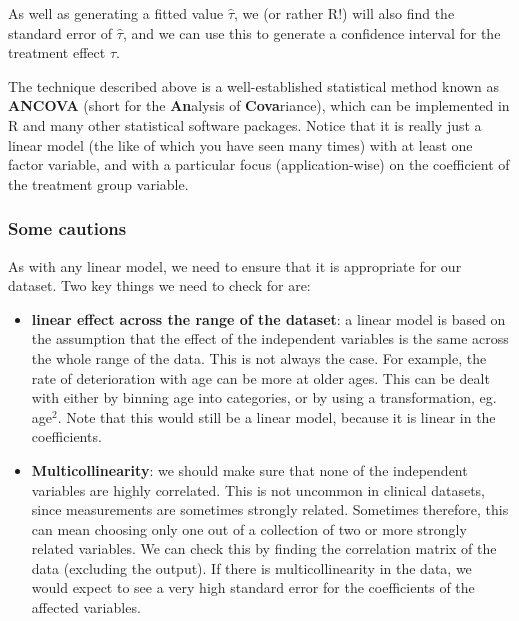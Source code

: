 \documentclass[
  openany]{book}
\providecommand{\tightlist}{%
  \setlength{\itemsep}{0pt}\setlength{\parskip}{0pt}}
\theoremstyle{definition}
\theoremstyle{definition}
\theoremstyle{definition}
\theoremstyle{definition}
\theoremstyle{remark}
\begin{document}
As well as generating a fitted value \(\hat{\tau}\), we (or rather R!) will also find the standard error of \(\hat\tau\), and we can use this to generate a confidence interval for the treatment effect \(\tau\).

The technique described above is a well-established statistical method known as \textbf{ANCOVA} (short for the \textbf{An}alysis of \textbf{Cova}riance), which can be implemented in R and many other statistical software packages. Notice that it is really just a linear model (the like of which you have seen many times) with at least one factor variable, and with a particular focus (application-wise) on the coefficient of the treatment group variable.

\subsubsection*{Some cautions}\label{some-cautions}

As with any linear model, we need to ensure that it is appropriate for our dataset. Two key things we need to check for are:

\begin{itemize}
\tightlist
\item
  \textbf{linear effect across the range of the dataset}: a linear model is based on the assumption that the effect of the independent variables is the same across the whole range of the data. This is not always the case. For example, the rate of deterioration with age can be more at older ages. This can be dealt with either by binning age into categories, or by using a transformation, eg. age\(^2\). Note that this would still be a linear model, because it is linear in the coefficients.
\item
  \textbf{Multicollinearity}: we should make sure that none of the independent variables are highly correlated. This is not uncommon in clinical datasets, since measurements are sometimes strongly related. Sometimes therefore, this can mean choosing only one out of a collection of two or more strongly related variables. We can check this by finding the correlation matrix of the data (excluding the output). If there is multicollinearity in the data, we would expect to see a very high standard error for the coefficients of the affected variables.
\end{itemize}
\end{document}
